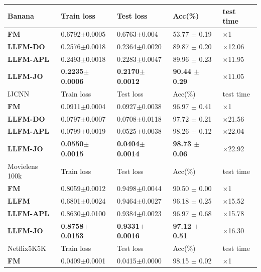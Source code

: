 \documentclass{article}
\begin{document}
\begin{table}
	\begin{tabu} to \textwidth {|X[c]| X[c]| X[c]| X[c]| X[c]|}
		\hline
		Banana              & Train loss & Test loss & Acc(\%) &test time \\
		\hline
		\textbf{FM} 		   		&0.6792$\pm$0.0005  &0.6763$\pm$0.004  & 53.77 $\pm$ 0.19 & $\times$1  \\ \hline
		\textbf{LLFM-DO}     		&0.2576$\pm$0.0018  &0.2364$\pm$0.0020  & 89.87 $\pm$ 0.20 & $\times$12.06 \\ \hline
		\textbf{LLFM-APL}       	&0.2493$\pm$0.0018  &0.2283$\pm$0.0047  & 89.96 $\pm$ 0.23 &$\times$11.95 \\ \hline
		\textbf{LLFM-JO}         &\textbf{0.2235$\pm$0.0006}  &\textbf{0.2170$\pm$0.0012}  & \textbf{90.44 $\pm$ 0.29} &$\times$11.05 \\ \hline
		\hline
		IJCNN              & Train loss & Test loss & Acc(\%) &test time \\
		\hline
		\textbf{FM} 		   	&0.0911$\pm$0.0004  &0.0927$\pm$0.0038  &96.97 $\pm$ 0.41  &$\times$1 \\ \hline
		\textbf{LLFM-DO}     		&0.0797$\pm$0.0007  &0.0708$\pm$0.0118  &97.72 $\pm$ 0.21  &$\times$21.56 \\ \hline
		\textbf{LLFM-APL}       &0.0799$\pm$0.0019  &0.0525$\pm$0.0038  &98.26 $\pm$ 0.12  &$\times$22.04 \\ \hline
		\textbf{LLFM-JO}         &\textbf{0.0550$\pm$0.0015}  &\textbf{0.0404$\pm$0.0014}  &\textbf{98.73 $\pm$ 0.06}   &$\times$22.92\\ \hline
		\hline
		Movielens 100k              & Train loss & Test loss & Acc(\%) &test time\\
		\hline
		\textbf{FM} 		   	&0.8059$\pm$0.0012  &0.9498$\pm$0.0044  & 90.50 $\pm$ 0.00  &$\times$1\\ \hline
		\textbf{LLFM}     		&0.6801$\pm$0.0024  &0.9464$\pm$0.0027  & 96.18 $\pm$ 0.25  &$\times$15.52\\ \hline
		\textbf{LLFM-APL}       &0.8630$\pm$0.0100  &0.9384$\pm$0.0023  & 96.97 $\pm$ 0.68  &$\times$15.78\\ \hline
		\textbf{LLFM-JO}         &\textbf{0.8758$\pm$0.0153}  &\textbf{0.9331$\pm$0.0016}  & \textbf{97.12 $\pm$ 0.51}   &$\times$16.30\\ \hline
		\hline
		Netflix5K5K              & Train loss & Test loss & Acc(\%) &test time\\
		\hline
		\textbf{FM} 		   	&0.0409$\pm$0.0001  &0.0415$\pm$0.0000  &98.15 $\pm$ 0.02  &$\times$1 \\ \hline

\end{tabu}
\end{table}
\end{document}
